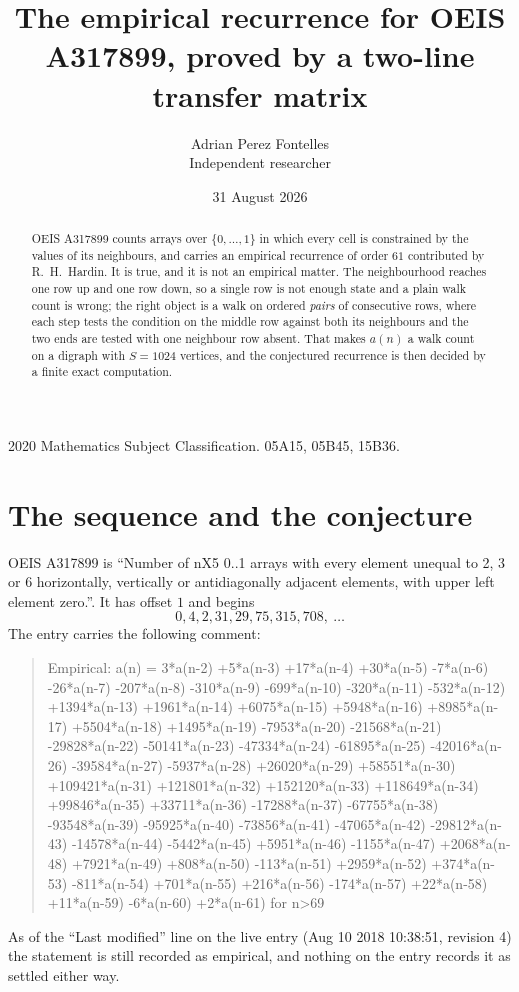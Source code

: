 \documentclass[11pt,a4paper]{article}
\title{The empirical recurrence for OEIS A317899, proved by a two-line transfer matrix}
\author{Adrian Perez Fontelles\\ \small Independent researcher}
\date{31 August 2026}
\theoremstyle{plain}
\theoremstyle{definition}
\begin{document}
\maketitle

\begin{abstract}
OEIS A317899 counts arrays over $\{0,\dots,1\}$ in which every cell is constrained by the
values of its neighbours, and carries an empirical recurrence of order $61$ contributed
by R.~H.~Hardin. It is true, and it is not an empirical matter. The neighbourhood reaches one
row up and one row down, so a single row is not enough state and a plain walk count
is wrong; the right object is a walk on ordered \emph{pairs} of consecutive rows, where
each step tests the condition on the middle row against both its neighbours and the two
ends are tested with one neighbour row absent. That makes $a(n)$ a walk count on a digraph
with $S=1024$ vertices, and the conjectured recurrence is then decided by a finite exact
computation.
\end{abstract}

\noindent\small 2020 Mathematics Subject Classification. 05A15, 05B45, 15B36.\normalsize

\section{The sequence and the conjecture}

OEIS A317899 is ``Number of nX5 0..1 arrays with every element unequal to 2, 3 or 6 horizontally, vertically or antidiagonally adjacent elements, with upper left element zero.''. It has offset $1$ and begins
\[
0, 4, 2, 31, 29, 75, 315, 708,\ \dots
\]
The entry carries the following comment:
\begin{quote}\small
Empirical: a(n) = 3*a(n-2) +5*a(n-3) +17*a(n-4) +30*a(n-5) -7*a(n-6) -26*a(n-7) -207*a(n-8) -310*a(n-9) -699*a(n-10) -320*a(n-11) -532*a(n-12) +1394*a(n-13) +1961*a(n-14) +6075*a(n-15) +5948*a(n-16) +8985*a(n-17) +5504*a(n-18) +1495*a(n-19) -7953*a(n-20) -21568*a(n-21) -29828*a(n-22) -50141*a(n-23) -47334*a(n-24) -61895*a(n-25) -42016*a(n-26) -39584*a(n-27) -5937*a(n-28) +26020*a(n-29) +58551*a(n-30) +109421*a(n-31) +121801*a(n-32) +152120*a(n-33) +118649*a(n-34) +99846*a(n-35) +33711*a(n-36) -17288*a(n-37) -67755*a(n-38) -93548*a(n-39) -95925*a(n-40) -73856*a(n-41) -47065*a(n-42) -29812*a(n-43) -14578*a(n-44) -5442*a(n-45) +5951*a(n-46) -1155*a(n-47) +2068*a(n-48) +7921*a(n-49) +808*a(n-50) -113*a(n-51) +2959*a(n-52) +374*a(n-53) -811*a(n-54) +701*a(n-55) +216*a(n-56) -174*a(n-57) +22*a(n-58) +11*a(n-59) -6*a(n-60) +2*a(n-61) for n>69
\end{quote}
As of the ``Last modified'' line on the live entry (Aug 10 2018 10:38:51, revision 4) the statement is
still recorded as empirical, and nothing on the entry records it as settled either way.
\end{document}
